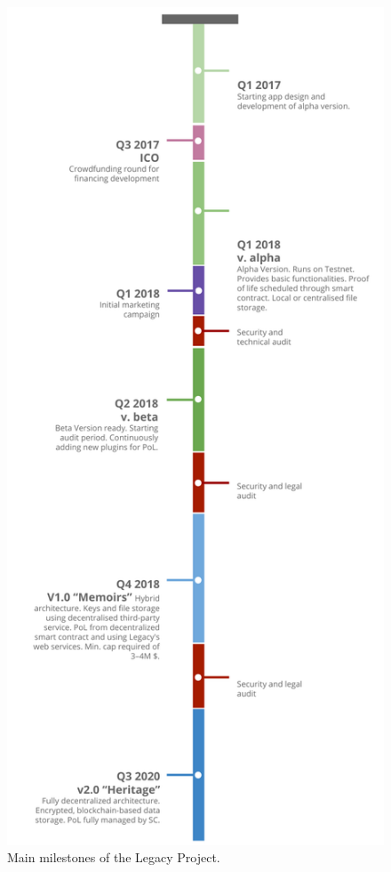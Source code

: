 \begin{figure}
	\centering
	\includegraphics[scale=0.6]{fig/roadmap_vertical.pdf}
	\caption{Main milestones of the Legacy Project.}
	\label{}
\end{figure}




